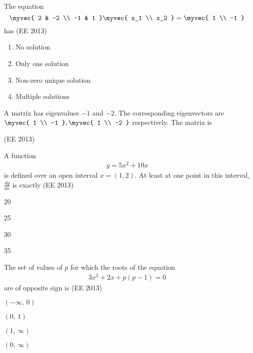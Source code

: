 \item The equation 
\[
\myvec{
2 & -2 \\ -1 & 1
}
\myvec{
x_1 \\ x_2
}
=
\myvec{
1 \\ -1
}
\]
has  
\hfill (EE 2013)
\begin{multicols}{2}
\begin{enumerate}
\item No solution  
\item Only one solution 
\item Non-zero unique solution  
\item Multiple solutions  
\end{enumerate}
\end{multicols}
\item A matrix has eigenvalues $-1$ and $-2$. The corresponding eigenvectors are 
$\myvec{ 1 \\ -1 }, 
\myvec{ 1 \\ -2 }
$
respectively. The matrix is

\hfill (EE 2013)
\begin{enumerate}
\begin{multicols}{4}
\item {}
\item {}
\item {}
\item {}
\end{multicols}
\end{enumerate}
\item A function 
\begin{align*}
    y = 5x^2 + 10x
\end{align*}
is defined over an open interval $x=(1,2)$. At least at one point in this interval, $\frac{dy}{dx}$ is exactly
\hfill (EE 2013)
\begin{enumerate}
\begin{multicols}{4}
\item 20
\item 25
\item 30
\item 35
\end{multicols}
\end{enumerate}
\item The set of values of $p$ for which the roots of the equation
\begin{align*}
    3x^{2} + 2x + p(p-1) = 0
\end{align*}
are of opposite sign is
\hfill (EE 2013)
\begin{enumerate}
\begin{multicols}{4}
\item $(-\infty,\,0)$
\item $(0,\,1)$
\item $(1,\,\infty)$
\item $(0,\,\infty)$
\end{multicols}
\end{enumerate}

